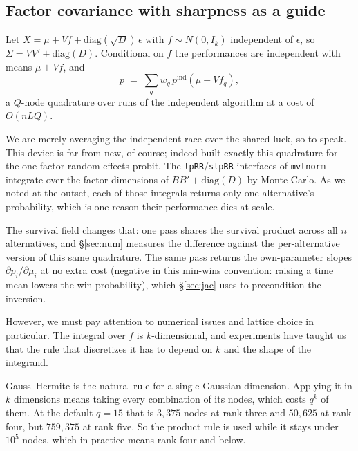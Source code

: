 \documentclass[11pt]{article}
\begin{document}
\subsection{Factor covariance with sharpness as a guide}\label{sec:factor}

Let $X=\mu+Vf+\mathrm{diag}(\sqrt D)\,\epsilon$ with $f\sim N(0,I_k)$
independent of $\epsilon$, so $\Sigma=VV'+\mathrm{diag}(D)$. Conditional on $f$
the performances are independent with means $\mu+Vf$, and
\begin{equation}
p \;=\; \sum_q w_q\, p^{\mathrm{ind}}(\mu+Vf_q),
\end{equation}
a $Q$-node quadrature over runs of the independent algorithm at a cost of
$O(nLQ)$.

We are merely averaging the independent race over the shared luck, so to speak. This device is far from new, of course; indeed
\citet{butler1982} built exactly this quadrature for the one-factor
random-effects probit. The \texttt{lpRR}/\texttt{slpRR} interfaces of
\texttt{mvtnorm} integrate over the factor dimensions of
$BB'+\mathrm{diag}(D)$ by Monte Carlo. As we noted at the outset, each of
those integrals returns only one alternative's probability, which is one
reason their performance dies at scale.

The survival field changes that: one pass shares the survival product across all
$n$ alternatives, and \S\ref{sec:num} measures the difference against the
per-alternative version of this same quadrature. The same pass returns the own-parameter slopes $\partial p_i/\partial\mu_i$
at no extra cost (negative in this min-wins convention: raising a time
mean lowers the win probability), which \S\ref{sec:jac} uses to
precondition the inversion.

However, we must pay attention to numerical issues and lattice choice in particular. The integral over $f$ is $k$-dimensional, and experiments have taught us that the rule that discretizes it
has to depend on $k$ and the shape of the integrand.

Gauss--Hermite is the natural rule for a single Gaussian dimension.
Applying it in $k$ dimensions means taking every combination of its
nodes, which costs $q^{k}$ of them. At the default $q=15$ that is
$3{,}375$ nodes at rank three and $50{,}625$ at rank four, but
$759{,}375$ at rank five. So the product rule is used while it stays
under $10^{5}$ nodes, which in practice means rank four and below.
\end{document}

